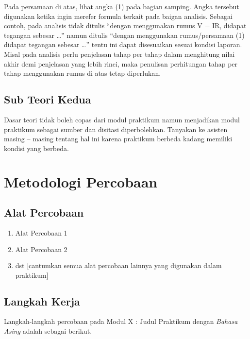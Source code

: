 \documentclass[conference]{IEEEtran}
\begin{document}
Pada persamaan di atas, lihat angka (1) pada bagian samping. Angka tersebut digunakan ketika ingin merefer formula terkait pada baigan analisis. Sebagai contoh, pada analisis tidak ditulis “dengan menggunakan rumus V = IR, didapat tegangan sebesar …” namun ditulis “dengan menggunakan rumus/persamaan (1) didapat tegangan sebesar …” tentu ini dapat disesuaikan sesuai kondisi laporan. Misal pada analisis perlu penjelasan tahap per tahap dalam menghitung nilai akhir demi penjelasan yang lebih rinci, maka penulisan perhitungan tahap per tahap menggunakan rumus di atas tetap diperlukan.

\subsection{Sub Teori Kedua}

Dasar teori tidak boleh copas dari modul praktikum namun menjadikan modul praktikum sebagai sumber dan disitasi diperbolehkan. Tanyakan ke asisten masing – masing tentang hal ini karena praktikum berbeda kadang memiliki kondisi yang berbeda.

\section{Metodologi Percobaan}

\subsection{Alat Percobaan}
\begin{enumerate}[1.]
    \item Alat Percobaan 1
    \item Alat Percobaan 2
    \item dst [cantumkan semua alat percobaan lainnya yang digunakan dalam praktikum] 
\end{enumerate}

\subsection{Langkah Kerja}
Langkah-langkah percobaan pada Modul X : Judul Praktikum dengan \textit{Bahasa Asing} adalah sebagai berikut.
\end{document}
